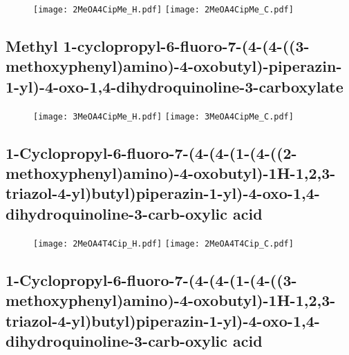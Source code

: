 \begin{figure}[H]
	\centering
		\texttt{[image: 2MeOA4CipMe\_H.pdf]}
		\texttt{[image: 2MeOA4CipMe\_C.pdf]}
\end{figure}

\subsection{Methyl 1\hyp{}cyclopropyl\hyp{}6\hyp{}fluoro\hyp{}7\hyp{}(4\hyp{}(4\hyp{}((3\hyp{}methoxyphenyl)amino)\hyp{}4\hyp{}oxobutyl)\hyp{}piperazin\hyp{}1\hyp{}yl)\hyp{}4\hyp{}oxo\hyp{}1,4\hyp{}dihydroquinoline\hyp{}3\hyp{}carboxylate }

\begin{figure}[H]
	\centering
		\texttt{[image: 3MeOA4CipMe\_H.pdf]}
		\texttt{[image: 3MeOA4CipMe\_C.pdf]}
\end{figure}

\subsection{1\hyp{}Cyclopropyl\hyp{}6\hyp{}fluoro\hyp{}7\hyp{}(4\hyp{}(4\hyp{}(1\hyp{}(4\hyp{}((2\hyp{}methoxyphenyl)amino)\hyp{}4\hyp{}oxobutyl)\hyp{}1H\hyp{}1,2,3\hyp{}triazol\hyp{}4\hyp{}yl)butyl)piperazin\hyp{}1\hyp{}yl)\hyp{}4\hyp{}oxo\hyp{}1,4\hyp{}dihydroquinoline\hyp{}3\hyp{}carb\hyp{}oxylic acid }

\begin{figure}[H]
	\centering
		\texttt{[image: 2MeOA4T4Cip\_H.pdf]}
		\texttt{[image: 2MeOA4T4Cip\_C.pdf]}
\end{figure}

\subsection{1\hyp{}Cyclopropyl\hyp{}6\hyp{}fluoro\hyp{}7\hyp{}(4\hyp{}(4\hyp{}(1\hyp{}(4\hyp{}((3\hyp{}methoxyphenyl)amino)\hyp{}4\hyp{}oxobutyl)\hyp{}1H\hyp{}1,2,3\hyp{}triazol\hyp{}4\hyp{}yl)butyl)piperazin\hyp{}1\hyp{}yl)\hyp{}4\hyp{}oxo\hyp{}1,4\hyp{}dihydroquinoline\hyp{}3\hyp{}carb\hyp{}oxylic acid }

